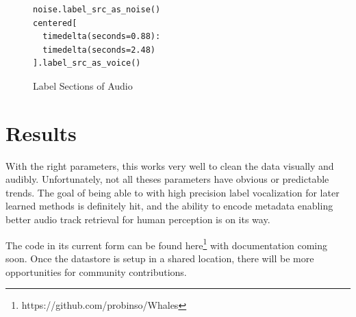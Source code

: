 \documentclass{article}
\begin{document}
\begin{multicols}{2}
\begin{figure}[H]
  \centering
  \begin{lstlisting}
noise.label_src_as_noise()
centered[
  timedelta(seconds=0.88):
  timedelta(seconds=2.48)
].label_src_as_voice()
\end{lstlisting}

  \caption{Label Sections of Audio}
  \label{fig:labeling}
\end{figure}

\section{Results}

With the right parameters, this works very well to clean the data visually and audibly. Unfortunately, not all theses parameters have obvious or predictable trends. The goal of being able to with high precision label vocalization for later learned methods is definitely hit, and the ability to encode metadata enabling better audio track retrieval for human perception is on its way.

The code in its current form can be found here\footnote{https://github.com/probinso/Whales} with documentation coming soon. Once the datastore is setup in a shared location, there will be more opportunities for community contributions.

{}




\end{multicols}
\end{document}
